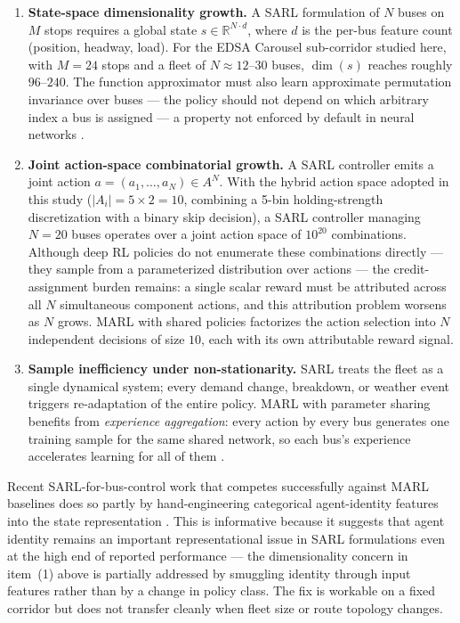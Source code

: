 \begin{enumerate}
\item \textbf{State-space dimensionality growth.} A SARL formulation of $N$ buses on $M$ stops requires a global state $s \in \mathbb{R}^{N \cdot d}$, where $d$ is the per-bus feature count (position, headway, load). For the EDSA Carousel sub-corridor studied here, with $M = 24$ stops and a fleet of $N \approx 12$--$30$ buses, $\dim(s)$ reaches roughly $96$--$240$. The function approximator must also learn approximate permutation invariance over buses --- the policy should not depend on which arbitrary index a bus is assigned --- a property not enforced by default in neural networks \cite{Wang2023MultiObj}.

\item \textbf{Joint action-space combinatorial growth.} A SARL controller emits a joint action $a = (a_1, \ldots, a_N) \in A^N$. With the hybrid action space adopted in this study ($|A_i| = 5 \times 2 = 10$, combining a 5-bin holding-strength discretization with a binary skip decision), a SARL controller managing $N = 20$ buses operates over a joint action space of $10^{20}$ combinations. Although deep RL policies do not enumerate these combinations directly --- they sample from a parameterized distribution over actions --- the credit-assignment burden remains: a single scalar reward must be attributed across all $N$ simultaneous component actions, and this attribution problem worsens as $N$ grows. MARL with shared policies factorizes the action selection into $N$ independent decisions of size $10$, each with its own attributable reward signal.

\item \textbf{Sample inefficiency under non-stationarity.} SARL treats the fleet as a single dynamical system; every demand change, breakdown, or weather event triggers re-adaptation of the entire policy. MARL with parameter sharing benefits from \textit{experience aggregation}: every action by every bus generates one training sample for the same shared network, so each bus's experience accelerates learning for all of them \cite{Christianos2021PS,Yu2022MAPPO}.
\end{enumerate}

Recent SARL-for-bus-control work that competes successfully against MARL baselines does so partly by hand-engineering categorical agent-identity features into the state representation \cite{Zhang2025SADRL}. This is informative because it suggests that agent identity remains an important representational issue in SARL formulations even at the high end of reported performance --- the dimensionality concern in item~(1) above is partially addressed by smuggling identity through input features rather than by a change in policy class. The fix is workable on a fixed corridor but does not transfer cleanly when fleet size or route topology changes.

